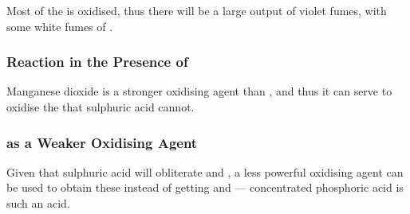 			Most of the  is oxidised, thus there will be a large output of violet fumes, with some white fumes of .



			\subsubsection{Reaction in the Presence of }

				Manganese dioxide is a stronger oxidising agent than , and thus it can serve to oxidise the  that sulphuric
				acid cannot.




			\subsubsection{ as a Weaker Oxidising Agent}

				Given that sulphuric acid will obliterate  and , a less powerful oxidising agent can be used to obtain these
				instead of getting  and  --- concentrated phosphoric acid is such an acid.





















